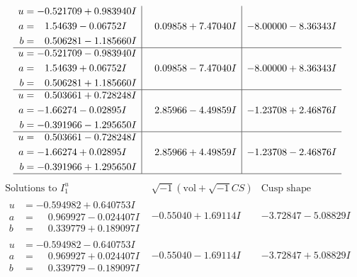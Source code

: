 \documentclass[1p]{elsarticle_modified}
\theoremstyle{definition}
\newcommand{\I}{\sqrt{-1}}
\begin{document}
$$\begin{array}{c|c|c}
\begin{aligned}
u &= -0.521709 + 0.983940 I \\
a &= \phantom{-}1.54639 - 0.06752 I \\
b &= \phantom{-}0.506281 - 1.185660 I\end{aligned}
 & \phantom{-}0.09858 + 7.47040 I & -8.00000 - 8.36343 I \\ \hline\begin{aligned}
u &= -0.521709 - 0.983940 I \\
a &= \phantom{-}1.54639 + 0.06752 I \\
b &= \phantom{-}0.506281 + 1.185660 I\end{aligned}
 & \phantom{-}0.09858 - 7.47040 I & -8.00000 + 8.36343 I \\ \hline\begin{aligned}
u &= \phantom{-}0.503661 + 0.728248 I \\
a &= -1.66274 - 0.02895 I \\
b &= -0.391966 - 1.295650 I\end{aligned}
 & \phantom{-}2.85966 - 4.49859 I & -1.23708 + 2.46876 I \\ \hline\begin{aligned}
u &= \phantom{-}0.503661 - 0.728248 I \\
a &= -1.66274 + 0.02895 I \\
b &= -0.391966 + 1.295650 I\end{aligned}
 & \phantom{-}2.85966 + 4.49859 I & -1.23708 - 2.46876 I\\
 \hline 
 \end{array}$$\newpage$$\begin{array}{c|c|c}  
\text{Solutions to }I^u_{1}& \I (\text{vol} + \sqrt{-1}CS) & \text{Cusp shape}\\
 \hline 
\begin{aligned}
u &= -0.594982 + 0.640753 I \\
a &= \phantom{-}0.969927 - 0.024407 I \\
b &= \phantom{-}0.339779 + 0.189097 I\end{aligned}
 & -0.55040 + 1.69114 I & -3.72847 - 5.08829 I \\ \hline\begin{aligned}
u &= -0.594982 - 0.640753 I \\
a &= \phantom{-}0.969927 + 0.024407 I \\
b &= \phantom{-}0.339779 - 0.189097 I\end{aligned}
 & -0.55040 - 1.69114 I & -3.72847 + 5.08829 I \\ \hline\begin{aligned}

\end{aligned}
\end{array}$$
\end{document}
